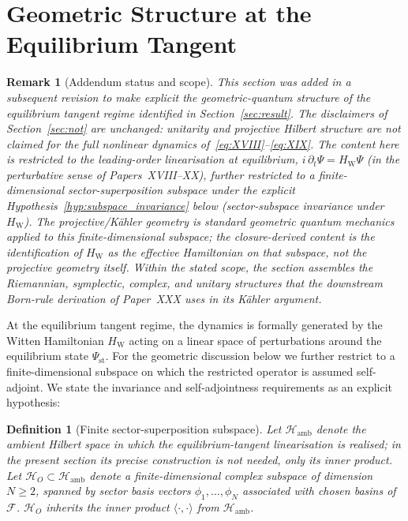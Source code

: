 \documentclass[12pt]{article}
\newtheorem{definition}[theorem]{Definition}
\newtheorem{remark}[theorem]{Remark}
\newcommand{\Fcal}{\mathcal{F}}
\newcommand{\HW}{H_{\mathrm{W}}}
\begin{document}
\section{Geometric Structure at the Equilibrium Tangent}\label{sec:geometric}

\begin{remark}[Addendum status and scope]\label{rem:addendum_geometric}
This section was added in a subsequent revision to make explicit the geometric-quantum structure of the equilibrium tangent regime identified in Section~\ref{sec:result}. The disclaimers of Section~\ref{sec:not} are unchanged: unitarity and projective Hilbert structure are \emph{not} claimed for the full nonlinear dynamics of~\eqref{eq:XVIII}--\eqref{eq:XIX}. The content here is restricted to the leading-order linearisation at equilibrium, $i\,\partial_t\Psi = \HW\Psi$ (in the perturbative sense of Papers~XVIII--XX), further restricted to a finite-dimensional sector-superposition subspace under the explicit Hypothesis~\ref{hyp:subspace_invariance} below (sector-subspace invariance under $\HW$). The projective/K\"ahler geometry is standard geometric quantum mechanics applied to this finite-dimensional subspace; the closure-derived content is the identification of $\HW$ as the effective Hamiltonian on that subspace, not the projective geometry itself. Within the stated scope, the section assembles the Riemannian, symplectic, complex, and unitary structures that the downstream Born-rule derivation of Paper~XXX uses in its K\"ahler argument.
\end{remark}

At the equilibrium tangent regime, the dynamics is formally generated by the Witten Hamiltonian $\HW$ acting on a linear space of perturbations around the equilibrium state $\Psi_{\mathrm{st}}$. For the geometric discussion below we further restrict to a finite-dimensional subspace on which the restricted operator is assumed self-adjoint. We state the invariance and self-adjointness requirements as an explicit hypothesis:

\begin{definition}[Finite sector-superposition subspace]\label{def:sector_subspace}
Let $\mathcal{H}_{\mathrm{amb}}$ denote the ambient Hilbert space in which the equilibrium-tangent linearisation is realised; in the present section its precise construction is not needed, only its inner product. Let $\mathcal{H}_O \subset \mathcal{H}_{\mathrm{amb}}$ denote a finite-dimensional complex subspace of dimension $N \geq 2$, spanned by sector basis vectors $\phi_1, \ldots, \phi_N$ associated with chosen basins of $\Fcal$. $\mathcal{H}_O$ inherits the inner product $\langle\cdot,\cdot\rangle$ from $\mathcal{H}_{\mathrm{amb}}$.
\end{definition}
\end{document}
